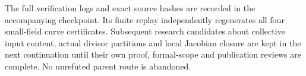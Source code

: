 The full verification logs and exact source hashes are recorded in the
accompanying checkpoint. Its finite replay independently regenerates
all four small-field curve certificates. Subsequent research candidates
about collective input content, actual divisor partitions and local
Jacobian closure are kept in the next continuation until their own
proof, formal-scope and publication reviews are complete. No unrefuted
parent route is abandoned.
